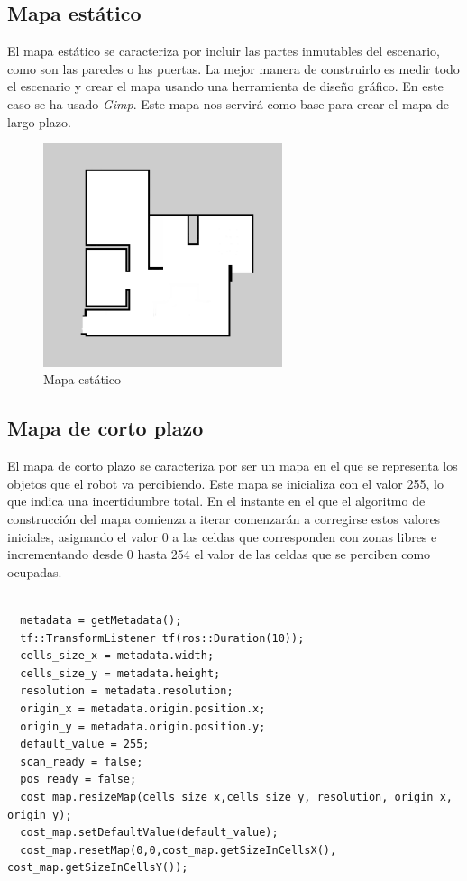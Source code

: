 \subsection{Mapa estático}
El mapa estático se caracteriza por incluir las partes inmutables del escenario, como son las paredes o las puertas. La mejor manera de construirlo es medir todo el escenario y crear el mapa usando una herramienta de diseño gráfico. En este caso se ha usado \textit{Gimp}.
Este mapa nos servirá como base para crear el mapa de largo plazo.

\begin{figure} [hbtp]
  \begin{center}
    \includegraphics[width=7cm]{img/cap4/mapaestatico}
  \end{center}
  \caption{Mapa estático}
  \label{fig:mapaestatico}
\end{figure}

\subsection{Mapa de corto plazo}
El mapa de corto plazo se caracteriza por ser un mapa en el que se representa los objetos que el robot va percibiendo. Este mapa se inicializa con el valor 255, lo que indica una incertidumbre total. En el instante en el que el algoritmo de construcción del mapa comienza a iterar comenzarán a corregirse estos valores iniciales, asignando el valor 0 a las celdas que corresponden con zonas libres e incrementando desde 0 hasta 254 el valor de las celdas que se perciben como ocupadas. \pagebreak

\renewcommand{\lstlistingname}{Código}
\begin{lstlisting}[caption=Inicialización del cost\_map correspondiente al mapa de corto plazo, label={lst:initcostmap}]

  metadata = getMetadata();
  tf::TransformListener tf(ros::Duration(10));
  cells_size_x = metadata.width;
  cells_size_y = metadata.height;
  resolution = metadata.resolution;
  origin_x = metadata.origin.position.x;
  origin_y = metadata.origin.position.y;
  default_value = 255;
  scan_ready = false;
  pos_ready = false;
  cost_map.resizeMap(cells_size_x,cells_size_y, resolution, origin_x, origin_y);
  cost_map.setDefaultValue(default_value);
  cost_map.resetMap(0,0,cost_map.getSizeInCellsX(), cost_map.getSizeInCellsY());
\end{lstlisting}


